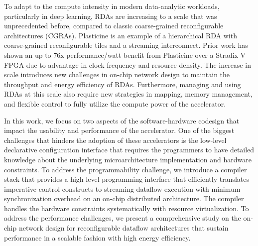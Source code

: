 To adapt to the compute intensity in modern data-analytic workloads, particularly in deep learning, 
RDAs are increasing to a scale that was unprecedented before, compared to classic coarse-grained
reconfigurable architectures (CGRAs).
Plasticine is an example of a hierarchical RDA with coarse-grained reconfigurable tiles and a
streaming interconnect.
Prior work has shown an up to 76x performance/watt benefit from Plasticine over a Stradix V FPGA 
due to advantage in clock frequency and resource density.
The increase in scale introduces new challenges in on-chip network design to maintain 
the throughput and energy efficiency of RDAs.
Furthermore, managing and using RDAs at this scale also require new strategies in mapping, 
memory management, and flexible control to fully utilize the compute power of the accelerator. 

In this work, we focus on two aspects of the software-hardware codesign that impact the usability
and performance of the accelerator. One of the biggest challenges that hinders the adoption of these
accelerators is the low-level declarative configuration interface that requires the programmers to
have detailed knowledge about the underlying microarchitecture implementation and hardware
constraints. To address the programmability challenge, we introduce a compiler stack that provides a high-level
programming interface that efficiently translates imperative control constructs to streaming
dataflow execution with minimum synchronization overhead on an on-chip distributed architecture. The
compiler handles the hardware constraints systematically with resource virtualization. To address
the performance challenges, we present a comprehensive study on the on-chip network design for 
reconfigurable dataflow architectures that sustain performance in a scalable fashion with high energy efficiency.
